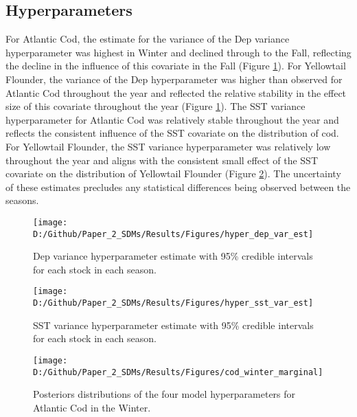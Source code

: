 \documentclass[
]{article}
\begin{document}
\hypertarget{hyperparameters}{%
\subsection{Hyperparameters}\label{hyperparameters}}

For Atlantic Cod, the estimate for the variance of the Dep variance hyperparameter was highest in Winter and declined through to the Fall, reflecting the decline in the influence of this covariate in the Fall (Figure \ref{fig:hyper-dep-var-est}). For Yellowtail Flounder, the variance of the Dep hyperparameter was higher than observed for Atlantic Cod throughout the year and reflected the relative stability in the effect size of this covariate throughout the year (Figure \ref{fig:hyper-dep-var-est}). The SST variance hyperparameter for Atlantic Cod was relatively stable throughout the year and reflects the consistent influence of the SST covariate on the distribution of cod. For Yellowtail Flounder, the SST variance hyperparameter was relatively low throughout the year and aligns with the consistent small effect of the SST covariate on the distribution of Yellowtail Flounder (Figure \ref{fig:hyper-sst-var-est}). The uncertainty of these estimates precludes any statistical differences being observed between the seasons.

\begin{figure}
\texttt{[image: D:/Github/Paper\_2\_SDMs/Results/Figures/hyper\_dep\_var\_est]} \caption{Dep variance hyperparameter estimate with 95\% credible intervals for each stock in each season.}\label{fig:hyper-dep-var-est}
\end{figure}

\clearpage

\begin{figure}
\texttt{[image: D:/Github/Paper\_2\_SDMs/Results/Figures/hyper\_sst\_var\_est]} \caption{SST variance hyperparameter estimate with 95\% credible intervals for each stock in each season.}\label{fig:hyper-sst-var-est}
\end{figure}

\clearpage

\begin{figure}
\texttt{[image: D:/Github/Paper\_2\_SDMs/Results/Figures/cod\_winter\_marginal]} \caption{Posteriors distributions of the four model hyperparameters for Atlantic Cod in the Winter.}\label{fig:hyper-cod-winter-post}
\end{figure}
\end{document}

